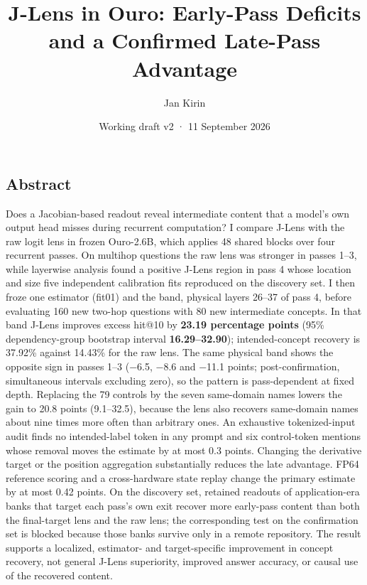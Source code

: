 \documentclass[
  british,
  11pt,
  a4paper,
]{article}
\title{J-Lens in Ouro: Early-Pass Deficits and a Confirmed Late-Pass
Advantage}
\author{Jan Kirin}
\date{Working draft v2 · 11 September 2026}
\begin{document}
\maketitle

\subsection{Abstract}\label{abstract}

Does a Jacobian-based readout reveal intermediate content that a model's
own output head misses during recurrent computation? I compare J-Lens
with the raw logit lens in frozen Ouro-2.6B, which applies 48 shared
blocks over four recurrent passes. On multihop questions the raw lens
was stronger in passes 1--3, while layerwise analysis found a positive
J-Lens region in pass 4 whose location and size five independent
calibration fits reproduced on the discovery set. I then froze one
estimator (fit01) and the band, physical layers 26--37 of pass 4, before
evaluating 160 new two-hop questions with 80 new intermediate concepts.
In that band J-Lens improves excess hit@10 by \textbf{23.19 percentage
points} (95\% dependency-group bootstrap interval
\textbf{16.29--32.90}); intended-concept recovery is 37.92\% against
14.43\% for the raw lens. The same physical band shows the opposite sign
in passes 1--3 (−6.5, −8.6 and −11.1 points; post-confirmation,
simultaneous intervals excluding zero), so the pattern is pass-dependent
at fixed depth. Replacing the 79 controls by the seven same-domain names
lowers the gain to 20.8 points (9.1--32.5), because the lens also
recovers same-domain names about nine times more often than arbitrary
ones. An exhaustive tokenized-input audit finds no intended-label token
in any prompt and six control-token mentions whose removal moves the
estimate by at most 0.3 points. Changing the derivative target or the
position aggregation substantially reduces the late advantage. FP64
reference scoring and a cross-hardware state replay change the primary
estimate by at most 0.42 points. On the discovery set, retained readouts
of application-era banks that target each pass's own exit recover more
early-pass content than both the final-target lens and the raw lens; the
corresponding test on the confirmation set is blocked because those
banks survive only in a remote repository. The result supports a
localized, estimator- and target-specific improvement in concept
recovery, not general J-Lens superiority, improved answer accuracy, or
causal use of the recovered content.
\end{document}
